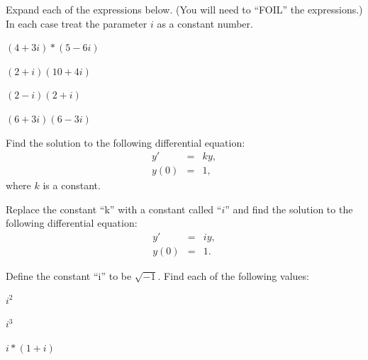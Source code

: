 

\begin{problem}
\item Expand each of the expressions below. (You will need to ``FOIL''
  the expressions.) In each case treat the parameter $i$ as a
  constant number.

  \begin{subproblem}
  \item $(4+3i)*(5-6i)$
    \vfill

  \item $(2+i)(10+4i)$
    \vfill
      
  \item $(2-i)(2+i)$
    \vfill

  \item $(6+3i)(6-3i)$
    \vfill

  \end{subproblem}
\end{problem}



  \begin{problem}
  \item Find the solution to the following differential equation:
    \begin{eqnarray*}
      y' & = & k y, \\
      y(0) & = & 1,
    \end{eqnarray*}
    where $k$ is a constant.
    \vfill

  \item Replace the constant ``k'' with a constant called ``$i$'' and
    find the solution to the following differential equation:
    \begin{eqnarray*}
      y' & = & i y, \\
      y(0) & = & 1.
    \end{eqnarray*}
    \label{problem:firstLookEulerFormula}
    \vfill


    \clearpage
  \item Define the constant ``i'' to be $\sqrt{-1}$. Find each of the
    following values:

    \begin{subproblem}
      \item $i^2$
        \vfill
      \item $i^3$
        \vfill
      \item $i*(1+i)$
        \vfill
    \end{subproblem}

  \end{problem}


